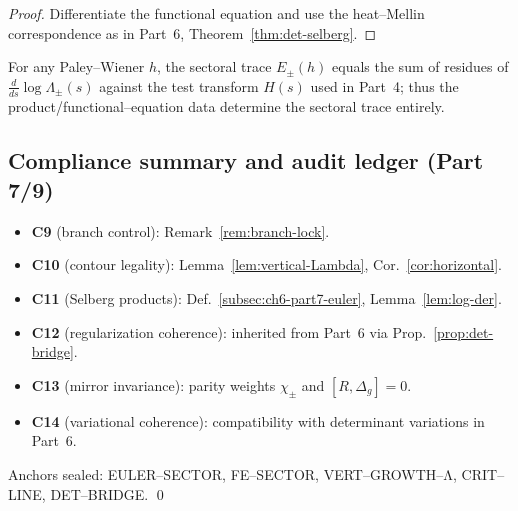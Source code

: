 \begin{proof}
Differentiate the functional equation and use the heat–Mellin correspondence as in Part~6, Theorem~\ref{thm:det-selberg}.  %
\end{proof}

\begin{corollary}
\label{cor:trace-retrieval}
For any Paley–Wiener $h$, the sectoral trace $E_\pm(h)$ equals the sum of residues of $\frac{d}{ds}\log\Lambda_\pm(s)$ against the test transform $H(s)$ used in Part~4; thus the product/functional–equation data determine the sectoral trace entirely.  %
\end{corollary}


\subsection{Compliance summary and audit ledger (Part 7/9)}
\label{subsec:ch6-part7-compliance} \relax \hspace{0pt}
\begin{remark}
\label{rem:part7-compliance}
\begin{itemize}[leftmargin=7mm]
  \item \textbf{C9} (branch control): Remark~\ref{rem:branch-lock}.
  \item \textbf{C10} (contour legality): Lemma~\ref{lem:vertical-Lambda}, Cor.~\ref{cor:horizontal}.
  \item \textbf{C11} (Selberg products): Def.~\ref{subsec:ch6-part7-euler}, Lemma~\ref{lem:log-der}.
  \item \textbf{C12} (regularization coherence): inherited from Part~6 via Prop.~\ref{prop:det-bridge}.
  \item \textbf{C13} (mirror invariance): parity weights $\chi_\pm$ and $[R,\Delta_g]=0$.
  \item \textbf{C14} (variational coherence): compatibility with determinant variations in Part~6.
\end{itemize}
Anchors sealed:
\textsf{EULER–SECTOR}, \textsf{FE–SECTOR}, \textsf{VERT–GROWTH–Λ},
\textsf{CRIT–LINE}, \textsf{DET–BRIDGE}. \qed
{} %
\end{remark}

